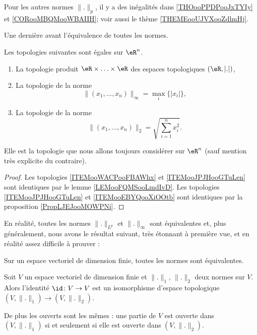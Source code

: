 Pour les autres normes \( \| . \|_p\), il y a des inégalités dans \ref{THOooPPDPooJxTYIy} et \ref{CORooMBQMooWBAIIH}; voir aussi le thème \ref{THEMEooUJVXooZdlmHj}.

Une dernière avant l'équivalence de toutes les normes.
\begin{propositionDef}
    Les topologies suivantes sont égales sur \( \eR^n\).
    \begin{enumerate}
        \item       \label{ITEMooWACPooFBAWhx}
            La topologie produit \( \eR\times \ldots\times \eR\) des espaces topologiques \( (\eR,| . |)\),
        \item       \label{ITEMooJPJHooGTuLen}
            La topologie de la norme
            \begin{equation}
                \| (x_1,\ldots, x_n) \|_{\infty}=\max_i\{ | x_i | \},
            \end{equation}
        \item       \label{ITEMooEBYQooXiOOtb}
            La topologie de la norme
            \begin{equation}
                \| (x_1,\ldots, x_n) \|_2=\sqrt{ \sum_{i=1}^nx_i^2 }.
            \end{equation}
    \end{enumerate}
    Elle est la topologie que nous allons toujours considérer sur \( \eR^n\) (sauf mention très explicite du contraire).
\end{propositionDef}

\begin{proof}
    Les topologies \ref{ITEMooWACPooFBAWhx} et \ref{ITEMooJPJHooGTuLen} sont identiques par le lemme \ref{LEMooFQMSooLmdIvD}. Les topologies \ref{ITEMooJPJHooGTuLen} et \ref{ITEMooEBYQooXiOOtb} sont identiques par la proposition \ref{PropLJEJooMOWPNi}.
\end{proof}

En réalité, toutes les normes \( \| . \|_{L^p}\) et \( \| . \|_{\infty}\) sont équivalentes et, plus généralement, nous avons le résultat suivant, très étonnant à première vue, et en réalité assez difficile à prouver :
\begin{theorem}    \label{ThoNormesEquiv}
    Sur un espace vectoriel de dimension finie, toutes les normes sont équivalentes.
\end{theorem}

\begin{corollary}       \label{CORooBRDYooLmGJDE}
    Soit \( V\) un espace vectoriel de dimension finie et \( \| . \|_1\), \( \| . \|_2\) deux normes sur \( V\). Alors l'identité \( \id\colon V\to V\) est un isomorphisme d'espace topologique \( (V,\| . \|_1)\to (V,\| . \|_2)\).

    De plus les ouverts sont les mêmes : une partie de \( V\) est ouverte dans \( (V,\| . \|_1)\) si et seulement si elle est ouverte dans \( (V,\| . \|_2)\).
\end{corollary}

